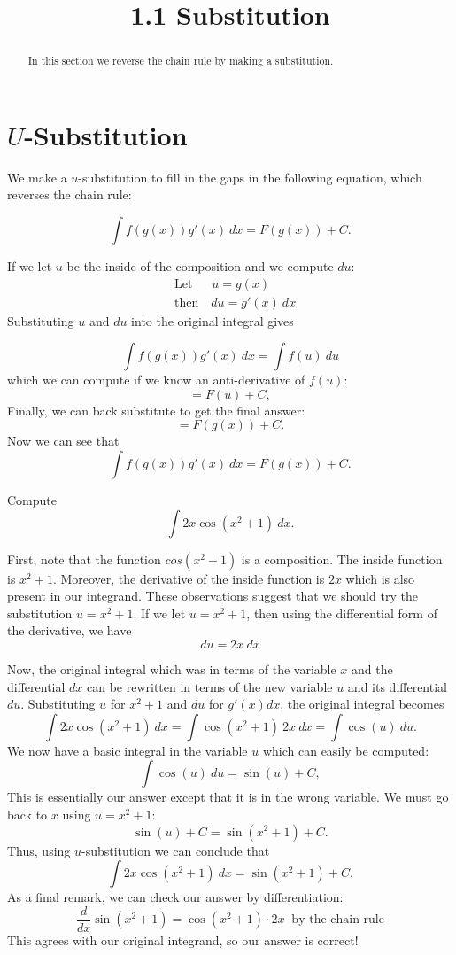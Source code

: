 \documentclass[handout]{ximera}
\title{1.1 Substitution}
\begin{document}
\begin{abstract}
In this section we reverse the chain rule by making a substitution.
\end{abstract}

\maketitle

\section{$U$-Substitution}

We make a $u$-substitution to fill in the gaps in the following equation, which reverses the chain rule:

\[\int f(g(x))g'(x) \ dx = F(g(x)) + C. \]

If we let $u$ be the inside of the composition and we compute $du$:
 \begin{align*}
 &\text{Let} \quad \;\;u  = g(x) \\
 &\text{then} \quad du = g'(x) \ dx
 \end{align*}
 Substituting $u$ and $du$ into the original integral gives

\[\int f(g(x))g'(x) \ dx = \int f(u) \ du \]
which we can compute if we know an anti-derivative of $f(u)$:
\[=F(u) + C,\]
Finally, we can back substitute to get the final answer:
\[=F(g(x)) + C. \]
Now we can see that
\[\int f(g(x))g'(x) \ dx = F(g(x)) + C. \]



\begin{example}[example 1]
Compute 
\[\int 2x\cos(x^2 + 1) \ dx.\]

First, note that the function $cos(x^2 + 1)$ is a composition.  The inside function is $x^2 + 1$.
Moreover, the derivative of the inside function is $2x$ which is also present in our integrand.
These observations suggest that we should try the substitution $u = x^2 + 1$.
If we let $u = x^2 + 1$, then using the differential form of the derivative,  we have
\[du = 2x \ dx\]

Now, the original integral which was in terms of the variable $x$ and the differential $dx$ can be rewritten in terms of the new variable $u$ and its differential $du$.  Substituting $u$ for $x^2 + 1$ and $du$ for $g'(x) dx$, the original integral becomes 
\[\int 2x\cos(x^2 + 1) \ dx = \int \cos(x^2 + 1) \ 2x\  dx = \int \cos(u) \ du.\]
We now have a basic integral in the variable $u$ which can easily be computed:
\[\int \cos(u) \ du = \sin(u) + C,\]
This is essentially our answer except that it is in the wrong variable.  We must go back to $x$ using $u = x^2 + 1$: 
\[\sin(u) + C = \sin(x^2 + 1) + C.\]
Thus, using $u$-substitution we can conclude that
\[\int 2x\cos(x^2 + 1) \ dx =  \sin(x^2 + 1) + C.\]
As a final remark, we can check our answer by differentiation:
\[
\frac{d}{dx} \sin(x^2 + 1) = \cos(x^2 +1) \cdot 2x \;\; \text{by the chain rule}
\]
This agrees with our original integrand, so our answer is correct!
\end{example}
\end{document}
